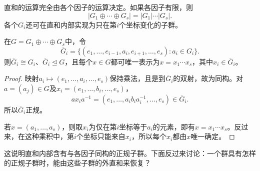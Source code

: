 直和的运算完全由各个因子的运算决定。如果各因子有限，则
\[
|G_1\oplus\cdots\oplus G_s|=|G_1|\cdots|G_s|.
\]
各个$G_i$还可在直和内部实现为只在第$i$个坐标变化的子群。

\begin{proposition}
在$G=G_1\oplus\cdots\oplus G_s$中，令
\[
\overline G_i=\{(e_1,\ldots,e_{i-1},a_i,e_{i+1},\ldots,e_s):a_i\in G_i\}.
\]
则$\overline G_i\cong G_i$、$\overline G_i\trianglelefteq G$，且每个$x\in G$都可唯一表示为$x=x_1\cdots x_s$，其中$x_i\in\overline G_i$。
\end{proposition}
\begin{proof}
映射$a_i\mapsto(e_1,\ldots,a_i,\ldots,e_s)$保持乘法，且是到$\overline G_i$的双射，故为同构。对$a=(a_j)\in G$及$x_i=(e_1,\ldots,b_i,\ldots,e_s)$，
\[
ax_ia^{-1}=(e_1,\ldots,a_ib_ia_i^{-1},\ldots,e_s)\in\overline G_i.
\]
所以$\overline G_i$正规。

若$x=(a_1,\ldots,a_s)$，则取$x_i$为仅在第$i$坐标等于$a_i$的元素，即有$x=x_1\cdots x_s$。反过来，在这种乘积中，第$i$个坐标只能来自$x_i$，所以每个$x_i$都由$x$唯一确定。
\end{proof}

这说明直和内部含有与各因子同构的正规子群。下面反过来讨论：一个群具有怎样的正规子群时，能由这些子群的外直和来恢复？

